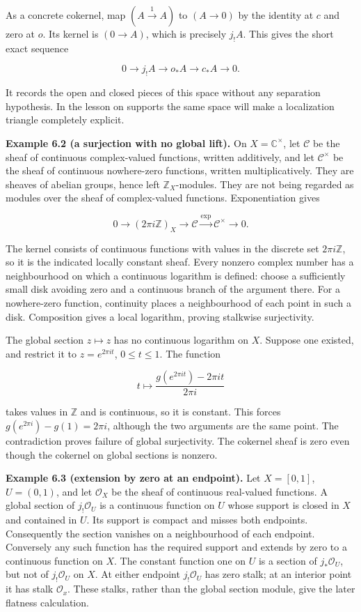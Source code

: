 \documentclass[
  english,
  11pt,
  a4paper,
]{article}
\begin{document}
As a concrete cokernel, map \((A\xrightarrow{1}A)\) to \((A\to0)\) by
the identity at \(c\) and zero at \(o\). Its kernel is \((0\to A)\),
which is precisely \(j_!A\). This gives the short exact sequence

\[0\to j_!A\to o_*A\to c_*A\to0.\]

It records the open and closed pieces of this space without any
separation hypothesis. In the lesson on supports the same space will
make a localization triangle completely explicit.

\textbf{Example 6.2 (a surjection with no global lift).} On
\(X=\mathbb C^{\times}\), let \(\mathcal C\) be the sheaf of continuous
complex-valued functions, written additively, and let
\(\mathcal C^{\times}\) be the sheaf of continuous nowhere-zero
functions, written multiplicatively. They are sheaves of abelian groups,
hence left \(\mathbb Z_X\)-modules. They are not being regarded as
modules over the sheaf of complex-valued functions. Exponentiation gives

\[0\longrightarrow(2\pi i\mathbb Z)_X
\longrightarrow\mathcal C\xrightarrow{\exp}\mathcal C^{\times}
\longrightarrow0.\]

The kernel consists of continuous functions with values in the discrete
set \(2\pi i\mathbb Z\), so it is the indicated locally constant sheaf.
Every nonzero complex number has a neighbourhood on which a continuous
logarithm is defined: choose a sufficiently small disk avoiding zero and
a continuous branch of the argument there. For a nowhere-zero function,
continuity places a neighbourhood of each point in such a disk.
Composition gives a local logarithm, proving stalkwise surjectivity.

The global section \(z\mapsto z\) has no continuous logarithm on \(X\).
Suppose one existed, and restrict it to \(z=e^{2\pi it}\),
\(0\le t\le1\). The function

\[t\longmapsto\frac{g(e^{2\pi it})-2\pi it}{2\pi i}\]

takes values in \(\mathbb Z\) and is continuous, so it is constant. This
forces \(g(e^{2\pi i})-g(1)=2\pi i\), although the two arguments are the
same point. The contradiction proves failure of global surjectivity. The
cokernel sheaf is zero even though the cokernel on global sections is
nonzero.

\textbf{Example 6.3 (extension by zero at an endpoint).} Let
\(X=[0,1]\), \(U=(0,1)\), and let \(\mathcal O_X\) be the sheaf of
continuous real-valued functions. A global section of
\(j_!\mathcal O_U\) is a continuous function on \(U\) whose support is
closed in \(X\) and contained in \(U\). Its support is compact and
misses both endpoints. Consequently the section vanishes on a
neighbourhood of each endpoint. Conversely any such function has the
required support and extends by zero to a continuous function on \(X\).
The constant function one on \(U\) is a section of \(j_*\mathcal O_U\),
but not of \(j_!\mathcal O_U\) on \(X\). At either endpoint
\(j_!\mathcal O_U\) has zero stalk; at an interior point it has stalk
\(\mathcal O_x\). These stalks, rather than the global section module,
give the later flatness calculation.
\end{document}

